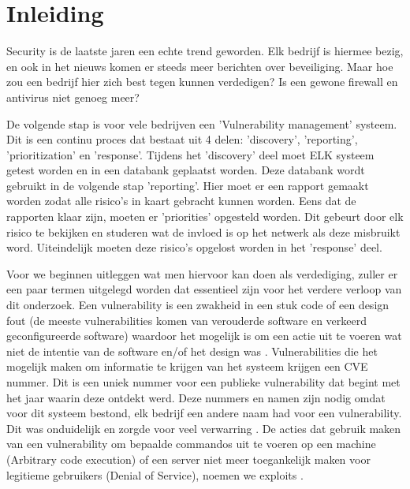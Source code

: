 
\chapter{Inleiding}
\label{ch:inleiding}

Security is de laatste jaren een echte trend geworden. Elk bedrijf is hiermee bezig, en ook in het nieuws komen er steeds meer berichten over beveiliging. Maar hoe zou een bedrijf hier zich best tegen kunnen verdedigen? Is een gewone firewall en antivirus niet genoeg meer?

De volgende stap is voor vele bedrijven een 'Vulnerability management' systeem. Dit is een continu proces dat bestaat uit 4 delen:  'discovery', 'reporting', 'prioritization' en 'response'. Tijdens het 'discovery' deel moet ELK systeem getest worden en in een databank geplaatst worden. Deze databank wordt gebruikt in de volgende stap 'reporting'. Hier moet er een rapport gemaakt worden zodat alle risico's in kaart gebracht kunnen worden. Eens dat de rapporten klaar zijn, moeten er 'priorities' opgesteld worden. Dit gebeurt door elk risico te bekijken en studeren wat de invloed is op het netwerk als deze misbruikt word. Uiteindelijk moeten deze risico's opgelost worden in het 'response' deel. \textcite{Tripwire}

Voor we beginnen uitleggen wat men hiervoor kan doen als verdediging, zuller er een paar termen uitgelegd worden dat essentieel zijn voor het verdere verloop van dit onderzoek. Een vulnerability is een zwakheid in een stuk code of een design fout (de meeste vulnerabilities komen van verouderde software en verkeerd geconfigureerde software) waardoor het mogelijk is om een actie uit te voeren wat niet de intentie van de software en/of het design was \textcite{Techtarget-vuln}. Vulnerabilities die het mogelijk maken om informatie te krijgen van het systeem krijgen een CVE nummer. Dit is een uniek nummer voor een publieke vulnerability dat begint met het jaar waarin deze ontdekt werd. Deze nummers en namen zijn nodig omdat voor dit systeem bestond, elk bedrijf een andere naam had voor een vulnerability. Dit was onduidelijk en zorgde voor veel verwarring \textcite{cve-mitre}. De acties dat gebruik maken van een vulnerability om bepaalde commandos uit te voeren op een machine (Arbitrary code execution) of een server niet meer toegankelijk maken voor legitieme gebruikers (Denial of Service), noemen we exploits \textcite{Techtarget-exploit}.

